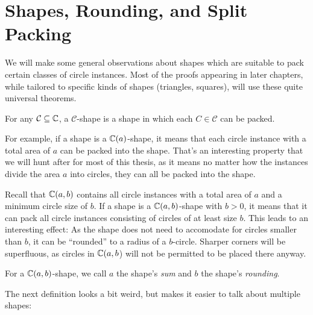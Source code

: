 \documentclass[%
    a4paper,              %
    style=screen,          %
    bibliography=totoc,   %
    nexus,                %
    lnum,                 %
    extramargin,          %
]{tubsbook}
\begin{document}
\section{Shapes, Rounding, and Split Packing}

We will make some general observations about shapes which are suitable to pack certain classes of circle instances. Most of the proofs appearing in later chapters, while tailored to specific kinds of shapes (triangles, squares), will use these quite universal theorems.

\begin{definition}
    For any $\mathcal{C} \subseteq \mathbb{C}$, a $\mathcal{C}$-shape is a shape in which each $C \in \mathcal{C}$ can be packed.
\end{definition}

For example, if a shape is a $\mathbb{C}(a)$-shape, it means that each circle instance with a total area of $a$ can be packed into the shape. That's an interesting property that we will hunt after for most of this thesis, as it means no matter how the instances divide the area $a$ into circles, they can all be packed into the shape.

Recall that $\mathbb{C}(a,b)$ contains all circle instances with a total area of $a$ and a minimum circle size of $b$. If a shape is a $\mathbb{C}(a,b)$-shape with $b > 0$, it means that it can pack all circle instances consisting of circles of at least size $b$. This leads to an interesting effect: As the shape does not need to accomodate for circles smaller than $b$, it can be “rounded” to a radius of a $b$-circle. Sharper corners will be superfluous, as circles in $\mathbb{C}(a,b$) will not be permitted to be placed there anyway.

\begin{definition}
    For a $\mathbb{C}(a,b)$-shape, we call $a$ the shape's \emph{sum} and $b$ the shape's \emph{rounding}.
\end{definition}


The next definition looks a bit weird, but makes it easier to talk about multiple shapes:
\end{document}
